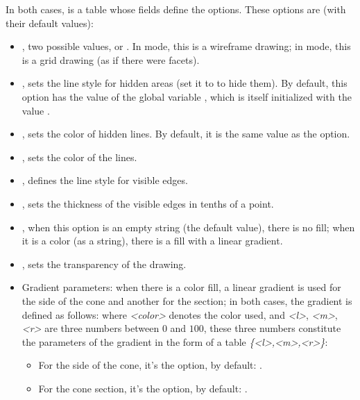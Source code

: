 In both cases,  is a table whose fields define the options. These options are (with their default values):
\begin{itemize}
    \item {}, two possible values,  or . In  mode, this is a wireframe drawing; in  mode, this is a grid drawing (as if there were facets).

    \item {}, sets the line style for hidden areas (set it to  to hide them). By default, this option has the value of the global variable , which is itself initialized with the value .

    \item {}, sets the color of hidden lines. By default, it is the same value as the  option.

    \item {}, sets the color of the lines.
    
    \item {}, defines the line style for visible edges.

    \item {}, sets the thickness of the visible edges in tenths of a point.    

    \item {}, when this option is an empty string (the default value), there is no fill; when it is a color (as a string), there is a fill with a linear gradient.

    \item {}, sets the transparency of the drawing.

    \item Gradient parameters: when there is a color fill, a linear gradient is used for the side of the cone and another for the section; in both cases, the gradient is defined as follows:
where \emph{<color>} denotes the color used, and \emph{<l>}, \emph{<m>}, \emph{<r>} are three numbers between $0$ and $100$, these three numbers constitute the parameters of the gradient in the form of a table \emph{\{<l>,<m>,<r>\}}:
        \begin{itemize}
            \item For the side of the cone, it's the  option, by default: .
            \item For the cone section, it's the  option, by default: .
        \end{itemize}
\end{itemize}


